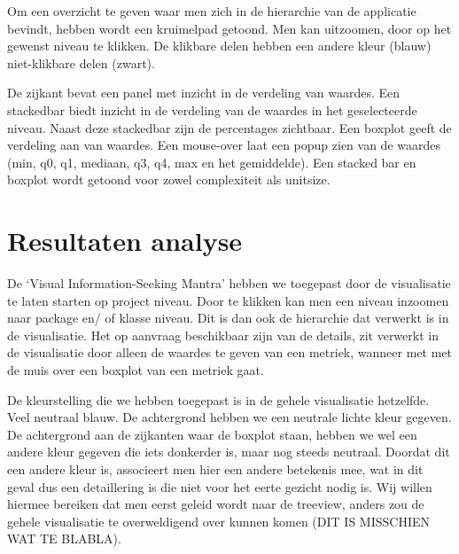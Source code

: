 \documentclass[a4paper]{article}
\begin{document}
Om een overzicht te geven waar men zich in de hierarchie van de applicatie bevindt, hebben wordt een kruimelpad getoond. Men kan uitzoomen, door op het gewenst niveau te klikken. De klikbare delen hebben een andere kleur (blauw) niet-klikbare delen (zwart).

De zijkant bevat een panel met inzicht in de verdeling van waardes. Een stackedbar biedt inzicht in de verdeling van de waardes in het geselecteerde niveau. Naast deze stackedbar zijn de percentages zichtbaar. Een boxplot geeft de verdeling aan van waardes. Een mouse-over laat een popup zien van de waardes (min, q0, q1, mediaan, q3, q4, max en het gemiddelde).
Een stacked bar en boxplot wordt getoond voor zowel complexiteit als unitsize.


\section{Resultaten analyse}
De `Visual Information-Seeking Mantra' hebben we toegepast door de visualisatie te laten starten op project niveau. Door te klikken kan men een niveau inzoomen naar package en/ of klasse niveau. Dit is dan ook de hierarchie dat verwerkt is in de visualisatie. Het op aanvraag beschikbaar zijn van de details, zit verwerkt in de visualisatie door alleen de waardes te geven van een metriek, wanneer met met de muis over een boxplot van een metriek gaat.

De kleurstelling die we hebben toegepast is in de gehele visualisatie hetzelfde. Veel neutraal blauw. De achtergrond hebben we een neutrale lichte kleur gegeven. De achtergrond aan de zijkanten waar de boxplot staan, hebben we wel een andere kleur gegeven die iets donkerder is, maar nog steeds neutraal. Doordat dit een andere kleur is, associeert men hier een andere betekenis mee, wat in dit geval dus een detaillering is die niet voor het eerte gezicht nodig is. Wij willen hiermee bereiken dat men eerst geleid wordt naar de treeview, anders zou de gehele visualisatie te overweldigend over kunnen komen (DIT IS MISSCHIEN WAT TE BLABLA).





\end{document}
